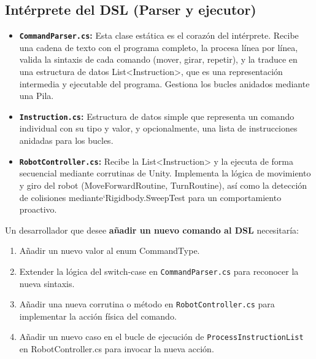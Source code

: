 \subsection{Intérprete del DSL (Parser y ejecutor)}
\begin{itemize}
	\item \textbf{\texttt{CommandParser.cs}:} Esta clase estática es el corazón del intérprete. Recibe una cadena de texto con el programa completo, la procesa línea por línea, valida la sintaxis de cada comando (mover, girar, repetir), y la traduce en una estructura de datos List<Instruction>, que es una representación intermedia y ejecutable del programa. Gestiona los bucles anidados mediante una Pila.
	\item \textbf{\texttt{Instruction.cs}:} Estructura de datos simple que representa un comando individual con su tipo y valor, y opcionalmente, una lista de instrucciones anidadas para los bucles.
	\item \textbf{\texttt{RobotController.cs}:} Recibe la List<Instruction> y la ejecuta de forma secuencial mediante corrutinas de Unity. Implementa la lógica de movimiento y giro del robot (MoveForwardRoutine, TurnRoutine), así como la detección de colisiones mediante`Rigidbody.SweepTest para un comportamiento proactivo.
\end{itemize}
Un desarrollador que desee \textbf{añadir un nuevo comando al DSL} necesitaría:
\begin{enumerate}
	\item Añadir un nuevo valor al enum CommandType.
	\item Extender la lógica del switch-case en \texttt{CommandParser.cs} para reconocer la nueva sintaxis.
	\item Añadir una nueva corrutina o método en \texttt{RobotController.cs} para implementar la acción física del comando.
	\item Añadir un nuevo caso en el bucle de ejecución de \texttt{ProcessInstructionList} en RobotController.cs para invocar la nueva acción.
\end{enumerate}


